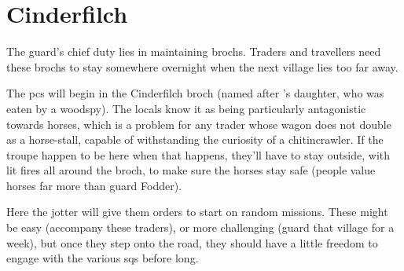 \section{Cinderfilch }



\begin{multicols}{2}

\noindent
The \gls{guard}'s chief duty lies in maintaining \glspl{broch}.
Traders and travellers need these \glspl{broch} to stay somewhere overnight when the next \gls{village} lies too far away.

The \glspl{pc} will begin in the Cinderfilch \gls{broch} (named after 's daughter, who was eaten by a woodspy).
The locals know it as being particularly antagonistic towards horses, which is a problem for any trader whose wagon does not double as a horse-stall, capable of withstanding the curiosity of a chitincrawler.
If the troupe happen to be here when that happens, they'll have to stay outside, with lit fires all around the \gls{broch}, to make sure the horses stay safe (people value horses far more than \gls{guard} Fodder).

Here the \gls{jotter} will give them orders to start on random missions.%
These might be easy (accompany these traders), or more challenging (guard that \gls{village} for a week), but once they step onto the road, they should have a little freedom to engage with the various \glspl{sq} before long.

\end{multicols}
